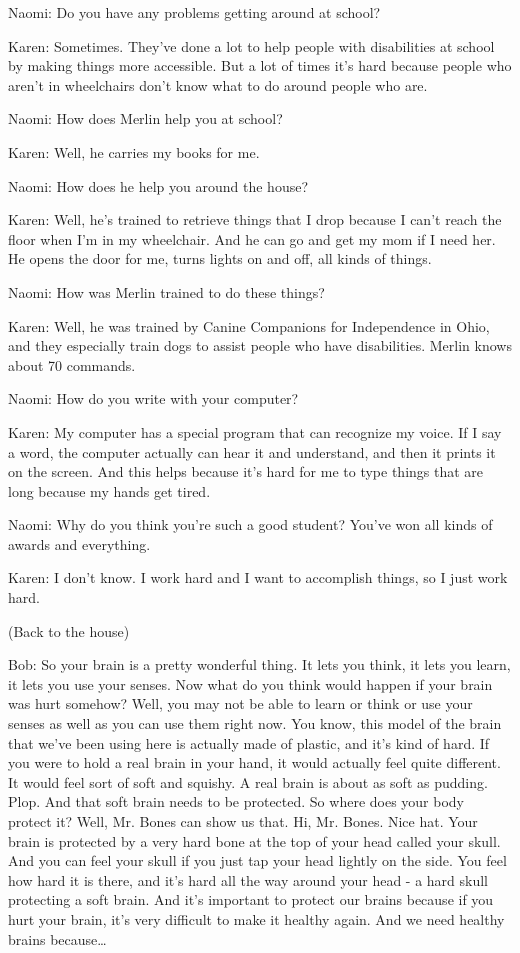 Naomi: Do you have any problems getting around at school?

Karen: Sometimes. They've done a lot to help people with disabilities at school by making things more accessible. But a lot of times it's hard because people who aren't in wheelchairs don't know what to do around people who are.

Naomi: How does Merlin help you at school?

Karen: Well, he carries my books for me.

Naomi: How does he help you around the house?

Karen: Well, he's trained to retrieve things that I drop because I can't reach the floor when I'm in my wheelchair. And he can go and get my mom if I need her. He opens the door for me, turns lights on and off, all kinds of things.

Naomi: How was Merlin trained to do these things?

Karen: Well, he was trained by Canine Companions for Independence in Ohio, and they especially train dogs to assist people who have disabilities. Merlin knows about 70 commands.

Naomi: How do you write with your computer?

Karen: My computer has a special program that can recognize my voice. If I say a word, the computer actually can hear it and understand, and then it prints it on the screen. And this helps because it's hard for me to type things that are long because my hands get tired.

Naomi: Why do you think you're such a good student? You've won all kinds of awards and everything.

Karen: I don't know. I work hard and I want to accomplish things, so I just work hard.

(Back to the house)

Bob: So your brain is a pretty wonderful thing. It lets you think, it lets you learn, it lets you use your senses. Now what do you think would happen if your brain was hurt somehow? Well, you may not be able to learn or think or use your senses as well as you can use them right now. You know, this model of the brain that we've been using here is actually made of plastic, and it's kind of hard. If you were to hold a real brain in your hand, it would actually feel quite different. It would feel sort of soft and squishy. A real brain is about as soft as pudding. Plop. And that soft brain needs to be protected. So where does your body protect it? Well, Mr. Bones can show us that. Hi, Mr. Bones. Nice hat. Your brain is protected by a very hard bone at the top of your head called your skull. And you can feel your skull if you just tap your head lightly on the side. You feel how hard it is there, and it's hard all the way around your head - a hard skull protecting a soft brain. And it's important to protect our brains because if you hurt your brain, it's very difficult to make it healthy again. And we need healthy brains because\dots

